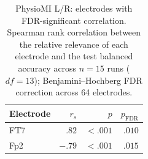 \begin{table}[ht]
\centering
\small
\setlength{\tabcolsep}{4pt}
\caption{PhysioMI L/R: electrodes with FDR-significant correlation. Spearman rank correlation between the relative relevance of each electrode and the test balanced accuracy across $n = 15$ runs ($\mathit{df} = 13$); Benjamini--Hochberg FDR correction across 64 electrodes.}
\label{tab:physiomi_spearman_bacc}
\begin{tabular}{lrrr}
\toprule
Electrode & $r_s$ & $p$ & $p_{\mathrm{FDR}}$ \\
\midrule
FT7 & $.82$ & $< .001$ & $.010$ \\
Fp2 & $-.79$ & $< .001$ & $.015$ \\
\bottomrule
\end{tabular}
\end{table}

